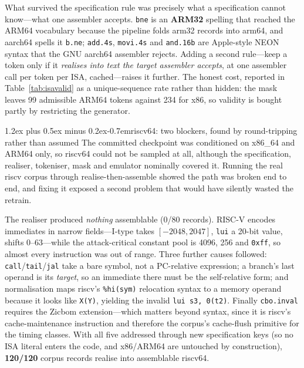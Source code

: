 \documentclass[conference]{IEEEtran}
\makeatletter
\renewcommand\paragraph{\@startsection{paragraph}{4}{\z@}%
  {1.2ex plus 0.5ex minus 0.2ex}{-0.7em}{\normalfont\normalsize\bfseries}}
\makeatother
\begin{document}
What survived the specification rule was precisely what a specification cannot
know---what one assembler accepts. \texttt{bne} is an \textbf{ARM32} spelling
that reached the ARM64 vocabulary because the pipeline folds arm32 records into
arm64, and aarch64 spells it \texttt{b.ne}; \texttt{add.4s}, \texttt{movi.4s}
and \texttt{and.16b} are Apple-style NEON syntax that the GNU aarch64 assembler
rejects. Adding a second rule---keep a token only if it \emph{realises into
text the target assembler accepts}, at one assembler call per token per ISA,
cached---raises it further.
The honest cost, reported in
Table~\ref{tab:isavalid} as a unique-sequence rate rather than hidden: the mask
leaves 99 admissible ARM64 tokens against 234 for x86, so validity is bought
partly by restricting the generator.

\paragraph{riscv64: two blockers, found by round-tripping rather than assumed}
The committed checkpoint was conditioned on x86\_64 and ARM64 only, so riscv64
could not be sampled at all, although the specification, realiser, tokeniser,
mask and emulator nominally covered it. Running the real riscv corpus through
realise-then-assemble showed the path was broken end to end, and fixing it
exposed a second problem that would have silently wasted the retrain.

The realiser produced \emph{nothing} assemblable (0/80 records). RISC-V encodes
immediates in narrow fields---I-type takes $[-2048, 2047]$, \texttt{lui} a
20-bit value, shifts $0$--$63$---while the attack-critical constant pool is
4096, 256 and \texttt{0xff}, so almost every instruction was out of range.
Three further causes followed: \texttt{call}/\texttt{tail}/\texttt{jal} take a
bare symbol, not a PC-relative expression; a branch's last operand is its
\emph{target}, so an immediate there must be the self-relative form; and
normalisation maps riscv's \texttt{\%hi(sym)} relocation syntax to a memory
operand because it looks like \texttt{X(Y)}, yielding the invalid
\texttt{lui s3, 0(t2)}. Finally \texttt{cbo.inval} requires the Zicbom
extension---which matters beyond syntax, since it is riscv's cache-maintenance
instruction and therefore the corpus's cache-flush primitive for the
timing classes. With all five addressed through new specification keys (so no
ISA literal enters the code, and x86/ARM64 are untouched by construction),
\textbf{120/120} corpus records realise into assemblable riscv64.
\end{document}
